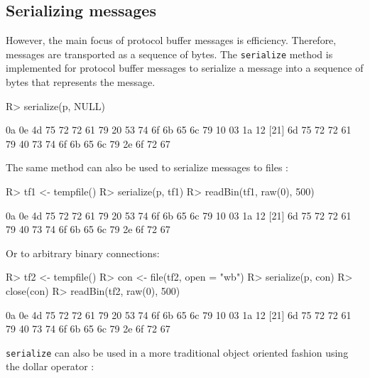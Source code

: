 \documentclass[article]{jss}
\begin{document}
\subsection{Serializing messages}

However, the main focus of protocol buffer messages is
efficiency. Therefore, messages are transported as a sequence
of bytes. The \texttt{serialize} method is implemented for
protocol buffer messages to serialize a message into a sequence of
bytes that represents the message.

\begin{Schunk}
\begin{Sinput}
R> serialize(p, NULL)
\end{Sinput}
\begin{Soutput}
 [1] 0a 0e 4d 75 72 72 61 79 20 53 74 6f 6b 65 6c 79 10 03 1a 12
[21] 6d 75 72 72 61 79 40 73 74 6f 6b 65 6c 79 2e 6f 72 67
\end{Soutput}
\end{Schunk}

The same method can also be used to serialize messages to files :

\begin{Schunk}
\begin{Sinput}
R> tf1 <- tempfile()
R> serialize(p, tf1)
R> readBin(tf1, raw(0), 500)
\end{Sinput}
\begin{Soutput}
 [1] 0a 0e 4d 75 72 72 61 79 20 53 74 6f 6b 65 6c 79 10 03 1a 12
[21] 6d 75 72 72 61 79 40 73 74 6f 6b 65 6c 79 2e 6f 72 67
\end{Soutput}
\end{Schunk}

Or to arbitrary binary connections:

\begin{Schunk}
\begin{Sinput}
R> tf2 <- tempfile()
R> con <- file(tf2, open = "wb")
R> serialize(p, con)
R> close(con)
R> readBin(tf2, raw(0), 500)
\end{Sinput}
\begin{Soutput}
 [1] 0a 0e 4d 75 72 72 61 79 20 53 74 6f 6b 65 6c 79 10 03 1a 12
[21] 6d 75 72 72 61 79 40 73 74 6f 6b 65 6c 79 2e 6f 72 67
\end{Soutput}
\end{Schunk}

\texttt{serialize} can also be used in a more traditional
object oriented fashion using the dollar operator :
\end{document}
